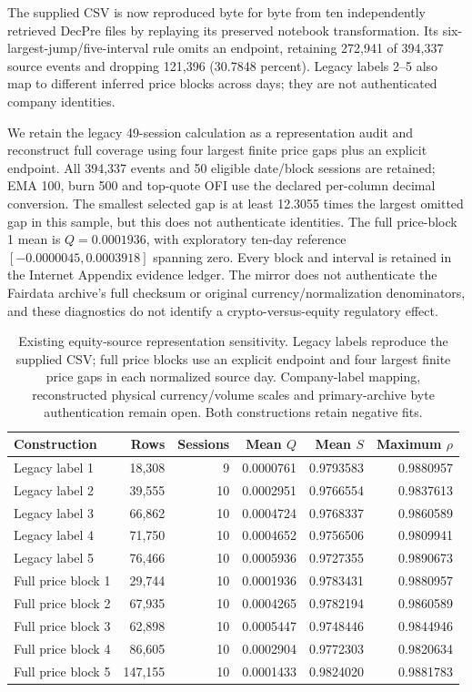 \documentclass[12pt]{article}
\theoremstyle{definition}
\theoremstyle{remark}
\begin{document}
The supplied CSV is now reproduced byte for byte from ten independently retrieved DecPre files by replaying its preserved notebook transformation. Its six-largest-jump/five-interval rule omits an endpoint, retaining 272,941 of 394,337 source events and dropping 121,396 (30.7848 percent). Legacy labels 2--5 also map to different inferred price blocks across days; they are not authenticated company identities.

We retain the legacy 49-session calculation as a representation audit and reconstruct full coverage using four largest finite price gaps plus an explicit endpoint. All 394,337 events and 50 eligible date/block sessions are retained; EMA 100, burn 500 and top-quote OFI use the declared per-column decimal conversion. The smallest selected gap is at least 12.3055 times the largest omitted gap in this sample, but this does not authenticate identities. The full price-block 1 mean is $Q=0.0001936$, with exploratory ten-day reference $[-0.0000045,0.0003918]$ spanning zero. Every block and interval is retained in the Internet Appendix evidence ledger. The mirror does not authenticate the Fairdata archive's full checksum or original currency/normalization denominators, and these diagnostics do not identify a crypto-versus-equity regulatory effect.

\begin{table}[htbp]\centering\small
\caption{Existing equity-source representation sensitivity. Legacy labels reproduce the supplied CSV; full price blocks use an explicit endpoint and four largest finite price gaps in each normalized source day. Company-label mapping, reconstructed physical currency/volume scales and primary-archive byte authentication remain open. Both constructions retain negative fits.}
\label{tab:equity_benchmark}
\begin{tabular}{lrrrrr}\toprule
Construction & Rows & Sessions & Mean $Q$ & Mean $S$ & Maximum $\rho$ \\\midrule
Legacy label 1 & 18,308 & 9 & 0.0000761 & 0.9793583 & 0.9880957 \\
Legacy label 2 & 39,555 & 10 & 0.0002951 & 0.9766554 & 0.9837613 \\
Legacy label 3 & 66,862 & 10 & 0.0004724 & 0.9768337 & 0.9860589 \\
Legacy label 4 & 71,750 & 10 & 0.0004652 & 0.9756506 & 0.9809941 \\
Legacy label 5 & 76,466 & 10 & 0.0005936 & 0.9727355 & 0.9890673 \\
\midrule
Full price block 1 & 29,744 & 10 & 0.0001936 & 0.9783431 & 0.9880957 \\
Full price block 2 & 67,935 & 10 & 0.0004265 & 0.9782194 & 0.9860589 \\
Full price block 3 & 62,898 & 10 & 0.0005447 & 0.9748446 & 0.9844946 \\
Full price block 4 & 86,605 & 10 & 0.0002904 & 0.9772303 & 0.9820634 \\
Full price block 5 & 147,155 & 10 & 0.0001433 & 0.9824020 & 0.9881783 \\
\bottomrule\end{tabular}\end{table}
\end{document}
